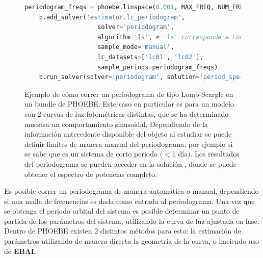 \begin{figure}[!ht]
	\begin{lstlisting}[language=python, autogobble]
	periodogram_freqs = phoebe.linspace(0.001, MAX_FREQ, NUM_FREQS)
	b.add_solver('estimator.lc_periodogram', 
					solver='periodogram',
					algorithm='ls', # 'ls' corresponde a Lomb-Scargle, 'bls' a BLS
					sample_mode='manual',
					lc_datasets=['lc01', 'lc02'],
					sample_periods=periodogram_freqs)
	b.run_solver(solver='periodogram', solution='period_spectrum')
	\end{lstlisting}
	\caption{Ejemplo de cómo correr un periodograma de tipo
	Lomb-Scargle en un bundle de PHOEBE. Este caso en particular es para un
	modelo con 2 curvas de luz fotométricas distintas, que se ha determinado
	muestra un comportamiento sinusoidal. Dependiendo de la información
	antecedente disponible del objeto al estudiar se puede definir limites de
	manera manual del periodograma, por ejemplo si se sabe que es un sistema de
	corto periodo ($<$1 día). Los resultados del periodograma se pueden acceder en
	la solución , donde se puede obtener el espectro de
	potencias completo.}
\end{figure}

Es posible correr un periodograma de manera automática o manual, dependiendo si
una malla de frecuencias es dada como entrada al periodograma. Una vez que se
obtenga el periodo orbital del sistema es posible determinar un punto de partida
de los parámetros del sistema, utilizando la curva de luz ajustada en fase.
Dentro de PHOEBE existen 2 distintos métodos para esto: la estimación de
parámetros utilizando de manera directa la geometría de la curva, o haciendo uso
de \textbf{EBAI}.

